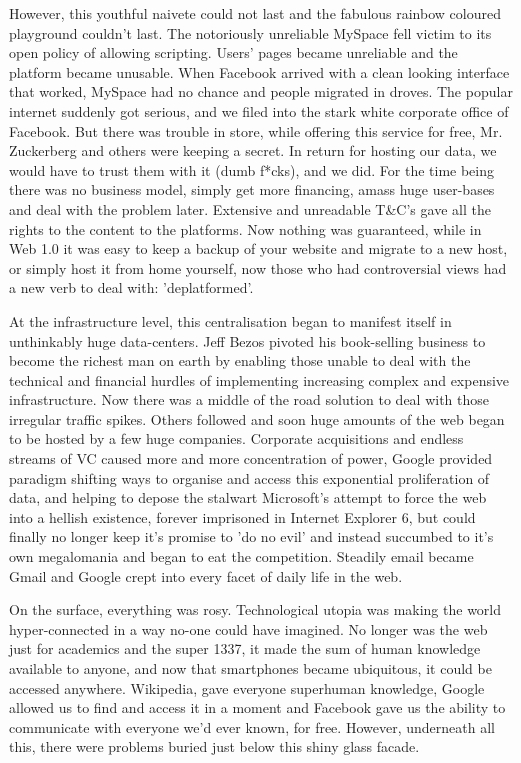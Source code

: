 However, this youthful naivete could not last and the fabulous rainbow coloured playground couldn't last. The notoriously unreliable MySpace fell victim to its open policy of allowing scripting. Users' pages became unreliable and the platform became unusable. When Facebook arrived with a clean looking interface that worked, MySpace had no chance and people migrated in droves. The popular internet suddenly got serious, and we filed into the stark white corporate office of Facebook. But there was trouble in store, while offering this service for free, Mr. Zuckerberg and others were keeping a secret. In return for hosting our data, we would have to trust them with it (dumb f*cks), and we did. For the time being there was no business model, simply get more financing, amass huge user-bases and deal with the problem later. Extensive and unreadable T\&C's gave all the rights to the content to the platforms. Now nothing was guaranteed, while in Web 1.0 it was easy to keep a backup of your website and migrate to a new host, or simply host it from home yourself, now those who had controversial views had a new verb to deal with: 'deplatformed'.

At the infrastructure level, this centralisation began to manifest itself in unthinkably huge data-centers. Jeff Bezos pivoted his book-selling business to become the richest man on earth by enabling those unable to deal with the technical and financial hurdles of implementing increasing complex and expensive infrastructure. Now there was a middle of the road solution to deal with those irregular traffic spikes. Others followed and soon huge amounts of the web began to be hosted by a few huge companies. Corporate acquisitions and endless streams of VC caused more and more concentration of power, Google provided paradigm shifting ways to organise and access this exponential proliferation of data, and helping to depose the stalwart Microsoft's attempt to force the web into a hellish existence, forever imprisoned in Internet Explorer 6, but could finally no longer keep it's promise to 'do no evil' and instead succumbed to it's own megalomania and began to eat the competition. Steadily email became Gmail and Google crept into every facet of daily life in the web.

On the surface, everything was rosy. Technological utopia was making the world hyper-connected in a way no-one could have imagined. No longer was the web just for academics and the super 1337, it made the sum of human knowledge available to anyone, and now that smartphones became ubiquitous, it could be accessed anywhere. Wikipedia, gave everyone superhuman knowledge, Google allowed us to find and access it in a moment and Facebook gave us the ability to communicate with everyone we'd ever known, for free. However, underneath all this, there were problems buried just below this shiny glass facade.

